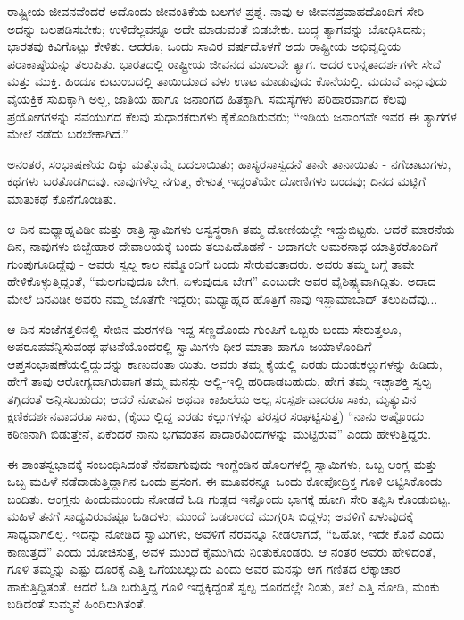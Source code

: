 ರಾಷ್ಟ್ರೀಯ ಜೀವನವೆಂದರೆ ಅದೊಂದು ಜೀವಂತಿಕೆಯ ಬಲಗಳ ಪ್ರಶ್ನೆ. ನಾವು ಆ ಜೀವನಪ್ರವಾಹದೊಂದಿಗೆ ಸೇರಿ ಅದನ್ನು ಬಲಪಡಿಸಬೇಕು; ಉಳಿದೆಲ್ಲವನ್ನೂ ಅದೇ ಮಾಡುವಂತೆ ಬಿಡಬೇಕು. ಬುದ್ಧ ತ್ಯಾಗವನ್ನು ಬೋಧಿಸಿದನು; ಭಾರತವು ಕಿವಿಗೊಟ್ಟು ಕೇಳಿತು. ಆದರೂ, ಒಂದು ಸಾವಿರ ವರ್ಷದೊಳಗೆ ಅದು ರಾಷ್ಟ್ರೀಯ ಅಭಿವೃದ್ಧಿಯ ಪರಾಕಾಷ್ಠೆಯನ್ನು ತಲುಪಿತು. ಭಾರತದಲ್ಲಿ ರಾಷ್ಟ್ರೀಯ ಜೀವನದ ಮೂಲವೇ ತ್ಯಾಗ. ಅದರ ಉನ್ನತಾದರ್ಶಗಳೇ ಸೇವೆ ಮತ್ತು ಮುಕ್ತಿ. ಹಿಂದೂ ಕುಟುಂಬದಲ್ಲಿ ತಾಯಿಯಾದ ವಳು ಊಟ ಮಾಡುವುದು ಕೊನೆಯಲ್ಲಿ. ಮದುವೆ ಎನ್ನುವುದು ವೈಯಕ್ತಿಕ ಸುಖಕ್ಕಾಗಿ ಅಲ್ಲ, ಜಾತಿಯ ಹಾಗೂ ಜನಾಂಗದ ಹಿತಕ್ಕಾಗಿ. ಸಮಸ್ಯೆಗಳು ಪರಿಹಾರವಾಗದ ಕೆಲವು ಪ್ರಯೋಗಗಳನ್ನು ನವಯುಗದ ಕೆಲವು ಸುಧಾರಕರುಗಳು ಕೈಕೊಂಡಿರುವರು; “ಇಡಿಯ ಜನಾಂಗವೇ ಇವರ ಈ ತ್ಯಾಗಗಳ ಮೇಲೆ ನಡೆದು ಬರಬೇಕಾಗಿದೆ.”

ಅನಂತರ, ಸಂಭಾಷಣೆಯ ದಿಕ್ಕು ಮತ್ತೊಮ್ಮೆ ಬದಲಾಯಿತು; ಹಾಸ್ಯರಸಾಸ್ವದನೆ ತಾನೇ ತಾನಾಯಿತು - ನಗೆಚಾಟುಗಳು, ಕಥೆಗಳು ಬರತೊಡಗಿದವು. ನಾವುಗಳೆಲ್ಲ ನಗುತ್ತ, ಕೇಳುತ್ತ ಇದ್ದಂತೆಯೇ ದೋಣಿಗಳು ಬಂದವು; ದಿನದ ಮಟ್ಟಿಗೆ ಮಾತುಕಥೆ ಕೊನೆಗೊಂಡಿತು.

ಆ ದಿನ ಮಧ್ಯಾಹ್ನವಿಡೀ ಮತ್ತು ರಾತ್ರಿ ಸ್ವಾಮಿಗಳು ಅಸ್ವಸ್ಥರಾಗಿ ತಮ್ಮ ದೋಣಿಯಲ್ಲೇ ಇದ್ದುಬಿಟ್ಟರು. ಆದರೆ ಮಾರನೆಯ ದಿನ, ನಾವುಗಳು ಬಿಜ್ಬೇಹಾರ ದೇವಾಲಯಕ್ಕೆ ಬಂದು ತಲುಪಿದೊಡನೆ - ಅದಾಗಲೇ ಅಮರನಾಥ ಯಾತ್ರಿಕರೊಂದಿಗೆ ಗುಂಪುಗೂಡಿದ್ದೆವು - ಅವರು ಸ್ವಲ್ಪ ಕಾಲ ನಮ್ಮೊಂದಿಗೆ ಬಂದು ಸೇರುವಂತಾದರು. ಅವರು ತಮ್ಮ ಬಗ್ಗೆ ತಾವೇ ಹೇಳಿಕೊಳ್ಳುತ್ತಿದ್ದಂತೆ, “ಮಲಗುವುದೂ ಬೇಗ, ಏಳುವುದೂ ಬೇಗ” ಎಂಬುದೇ ಅವರ ವೈಶಿಷ್ಟ್ಯವಾಗಿದ್ದಿತು. ಅದಾದ ಮೇಲೆ ದಿನವಿಡೀ ಅವರು ನಮ್ಮ ಜೊತೆಗೇ ಇದ್ದರು; ಮಧ್ಯಾಹ್ನದ ಹೊತ್ತಿಗೆ ನಾವು ಇಸ್ಲಾಮಾಬಾದ್ ತಲುಪಿದೆವು...

ಆ ದಿನ ಸಂಜೆಗತ್ತಲಿನಲ್ಲಿ ಸೇಬಿನ ಮರಗಳಡಿ ಇದ್ದ ಸಣ್ಣದೊಂದು ಗುಂಪಿಗೆ ಒಬ್ಬರು ಬಂದು ಸೇರುತ್ತಲೂ, ಅಪರೂಪವೆನ್ನಿಸುವಂಥ ಘಟನೆಯೊಂದರಲ್ಲಿ ಸ್ವಾಮಿಗಳು ಧೀರ ಮಾತಾ ಹಾಗೂ ಜಯಾಳೊಂದಿಗೆ ಆಪ್ತಸಂಭಾಷಣೆಯಲ್ಲಿದ್ದುದನ್ನು ಕಾಣುವಂತಾ ಯಿತು. ಅವರು ತಮ್ಮ ಕೈಯಲ್ಲಿ ಎರಡು ದುಂಡುಕಲ್ಲುಗಳನ್ನು ಹಿಡಿದು, ಹೇಗೆ ತಾವು ಆರೋಗ್ಯವಾಗಿರುವಾಗ ತಮ್ಮ ಮನಸ್ಸು ಅಲ್ಲಿ-ಇಲ್ಲಿ ಹರಿದಾಡಬಹುದು, ಹೇಗೆ ತಮ್ಮ ಇಚ್ಛಾಶಕ್ತಿ ಸ್ವಲ್ಪ ತಗ್ಗಿದಂತೆ ಅನ್ನಿಸಬಹುದು; ಆದರೆ ನೋವಿನ ಅಥವಾ ಕಾಹಿಲೆಯ ಅಲ್ಪ ಸಂಸ್ಪರ್ಶವಾದರೂ ಸಾಕು, ಮೃತ್ಯುವಿನ ಕ್ಷಣಿಕದರ್ಶನವಾದರೂ ಸಾಕು, (ಕೈಯ ಲ್ಲಿದ್ದ ಎರಡು ಕಲ್ಲುಗಳನ್ನು ಪರಸ್ಪರ ಸಂಘಟ್ಟಿಸುತ್ತ) “ನಾನು ಅಷ್ಟೊಂದು ಕಠಿಣನಾಗಿ ಬಿಡುತ್ತೇನೆ, ಏಕೆಂದರೆ ನಾನು ಭಗವಂತನ ಪಾದಾರವಿಂದಗಳನ್ನು ಮುಟ್ಟಿರುವೆ” ಎಂದು ಹೇಳುತ್ತಿದ್ದರು.

ಈ ಶಾಂತಸ್ವಭಾವಕ್ಕೆ ಸಂಬಂಧಿಸಿದಂತೆ ನೆನಪಾಗುವುದು ಇಂಗ್ಲೆಂಡಿನ ಹೊಲಗಳಲ್ಲಿ ಸ್ವಾಮಿಗಳು, ಒಬ್ಬ ಆಂಗ್ಲ ಮತ್ತು ಒಬ್ಬ ಮಹಿಳೆ ನಡೆದಾಡುತ್ತಿದ್ದಾಗಿನ ಒಂದು ಪ್ರಸಂಗ. ಈ ಮೂವರನ್ನೂ ಒಂದು ಕೋಪೋದ್ರಿಕ್ತ ಗೂಳಿ ಅಟ್ಟಿಸಿಕೊಂಡು ಬಂದಿತು. ಆಂಗ್ಲನು ಹಿಂದುಮುಂದು ನೋಡದೆ ಓಡಿ ಗುಡ್ಡದ ಇನ್ನೊಂದು ಭಾಗಕ್ಕೆ ಹೋಗಿ ಸೇರಿ ತಪ್ಪಿಸಿ ಕೊಂಡುಬಿಟ್ಟ. ಮಹಿಳೆ ತನಗೆ ಸಾಧ್ಯವಿರುವಷ್ಟೂ ಓಡಿದಳು; ಮುಂದೆ ಓಡಲಾರದೆ ಮುಗ್ಗರಿಸಿ ಬಿದ್ದಳು; ಅವಳಿಗೆ ಏಳುವುದಕ್ಕೆ ಸಾಧ್ಯವಾಗಲಿಲ್ಲ. ಇದನ್ನು ನೋಡಿದ ಸ್ವಾಮಿಗಳು, ಅವಳಿಗೆ ನೆರವನ್ನೂ ನೀಡಲಾಗದೆ, “ಒಹೋ, ಇದೇ ಕೊನೆ ಎಂದು ಕಾಣುತ್ತದೆ” ಎಂದು ಯೋಚಿಸುತ್ತ, ಅವಳ ಮುಂದೆ ಕೈಮುಗಿದು ನಿಂತುಕೊಂಡರು. ಆ ನಂತರ ಅವರು ಹೇಳಿದಂತೆ, ಗೂಳಿ ತಮ್ಮನ್ನು ಎಷ್ಟು ದೂರಕ್ಕೆ ಎತ್ತಿ ಒಗೆಯಬಲ್ಲುದು ಎಂದು ಅವರ ಮನಸ್ಸು ಆಗ ಗಣಿತದ ಲೆಕ್ಕಾಚಾರ ಹಾಕುತ್ತಿದ್ದಿತಂತೆ. ಆದರೆ ಓಡಿ ಬರುತ್ತಿದ್ದ ಗೂಳಿ ಇದ್ದಕ್ಕಿದ್ದಂತೆ ಸ್ವಲ್ಪ ದೂರದಲ್ಲೇ ನಿಂತು, ತಲೆ ಎತ್ತಿ ನೋಡಿ, ಮಂಕು ಬಡಿದಂತೆ ಸುಮ್ಮನೆ ಹಿಂದಿರುಗಿತಂತೆ.

